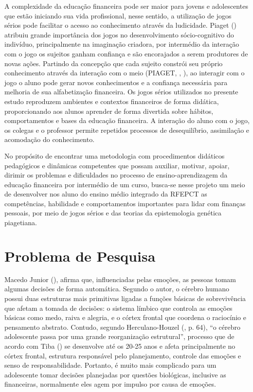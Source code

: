 A complexidade da educação financeira pode ser maior para jovens e adolescentes que estão iniciando sua vida profissional, nesse sentido, a utilização de jogos sérios pode facilitar o acesso ao conhecimento através da ludicidade. Piaget (\citeyear{piaget1990}) atribuiu grande importância dos jogos no desenvolvimento sócio-cognitivo do indivíduo, principalmente na imaginação criadora, por intermédio da interação com o jogo os sujeitos ganham confiança e são encorajados a serem produtores de novas ações. Partindo da concepção que cada sujeito constrói seu próprio conhecimento através da interação com o meio (PIAGET, \citeyear{piaget1971}, \citeyear{piaget1990}), ao interagir com o jogo o aluno pode gerar novos conhecimentos e a confiança necessária para melhoria de sua alfabetização financeira. Os jogos sérios utilizados no presente estudo reproduzem ambientes e contextos financeiros de forma didática, proporcionando aos alunos aprender de forma divertida sobre hábitos, comportamentos e bases da educação financeira. A interação do aluno com o jogo, os colegas e o professor permite repetidos processos de desequilíbrio, assimilação e acomodação do conhecimento.

No propósito de encontrar uma metodologia com procedimentos didáticos pedagógicos e dinâmicas competentes que possam auxiliar, motivar, apoiar, dirimir os problemas e dificuldades no processo de ensino-aprendizagem da educação financeira por intermédio de um curso, busca-se nesse projeto um meio de desenvolver nos aluno do ensino médio integrado da RFEPCT as competências, habilidade e comportamentos importantes para lidar com finanças pessoais, por meio de jogos sérios e das teorias da epistemologia genética piagetiana.

\section{Problema de Pesquisa}
Macedo Junior (\citeyear{macedo2013}), afirma que, influenciadas pelas emoções, as pessoas tomam algumas decisões de forma automática. Segundo o autor, o cérebro humano possui duas estruturas mais primitivas ligadas a funções básicas de sobrevivência que afetam a tomada de decisões: o sistema límbico que controla as emoções básicas como medo, raiva e alegria, e o córtex frontal que coordena o raciocínio e pensamento abstrato. Contudo, segundo Herculano-Houzel (\citeyear{herculano2005}, p. 64), “o cérebro adolescente passa por uma grande reorganização estrutural”, processo que de acordo com Tiba (\citeyear{tiba2005}) se desenvolve até os 20-25 anos e afeta principalmente no córtex frontal, estrutura responsável pelo planejamento, controle das emoções e senso de responsabilidade. Portanto, é muito mais complicado para um adolescente tomar decisões planejadas por questões biológicas, inclusive as financeiras, normalmente eles agem por impulso por causa de emoções.

